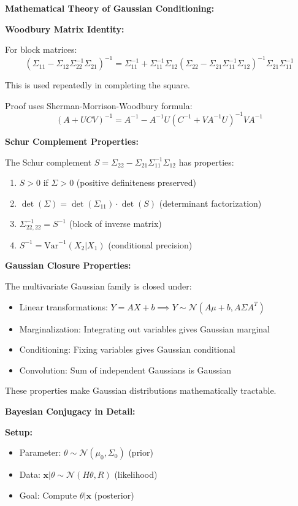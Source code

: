 \documentclass[12pt]{article}
\begin{document}
\begin{explanation}

\textbf{Mathematical Theory of Gaussian Conditioning:}

\textbf{Woodbury Matrix Identity:}

For block matrices:
\[
(\Sigma_{11} - \Sigma_{12}\Sigma_{22}^{-1}\Sigma_{21})^{-1} = \Sigma_{11}^{-1} + \Sigma_{11}^{-1}\Sigma_{12}(\Sigma_{22} - \Sigma_{21}\Sigma_{11}^{-1}\Sigma_{12})^{-1}\Sigma_{21}\Sigma_{11}^{-1}
\]

This is used repeatedly in completing the square.

Proof uses Sherman-Morrison-Woodbury formula:
\[
(A + UCV)^{-1} = A^{-1} - A^{-1}U(C^{-1} + VA^{-1}U)^{-1}VA^{-1}
\]

\textbf{Schur Complement Properties:}

The Schur complement $S = \Sigma_{22} - \Sigma_{21}\Sigma_{11}^{-1}\Sigma_{12}$ has properties:
\begin{enumerate}
    \item $S > 0$ if $\Sigma > 0$ (positive definiteness preserved)
    \item $\det(\Sigma) = \det(\Sigma_{11}) \cdot \det(S)$ (determinant factorization)
    \item $\Sigma^{-1}_{22,22} = S^{-1}$ (block of inverse matrix)
    \item $S^{-1} = \text{Var}^{-1}(X_2 | X_1)$ (conditional precision)
\end{enumerate}

\textbf{Gaussian Closure Properties:}

The multivariate Gaussian family is closed under:
\begin{itemize}
    \item Linear transformations: $Y = AX + b \implies Y \sim \mathcal{N}(A\mu + b, A\Sigma A^T)$
    \item Marginalization: Integrating out variables gives Gaussian marginal
    \item Conditioning: Fixing variables gives Gaussian conditional
    \item Convolution: Sum of independent Gaussians is Gaussian
\end{itemize}

These properties make Gaussian distributions mathematically tractable.

\textbf{Bayesian Conjugacy in Detail:}

\textbf{Setup:}
\begin{itemize}
    \item Parameter: $\theta \sim \mathcal{N}(\mu_0, \Sigma_0)$ (prior)
    \item Data: $\mathbf{x} | \theta \sim \mathcal{N}(H\theta, R)$ (likelihood)
    \item Goal: Compute $\theta | \mathbf{x}$ (posterior)
\end{itemize}


\end{explanation}
\end{document}
